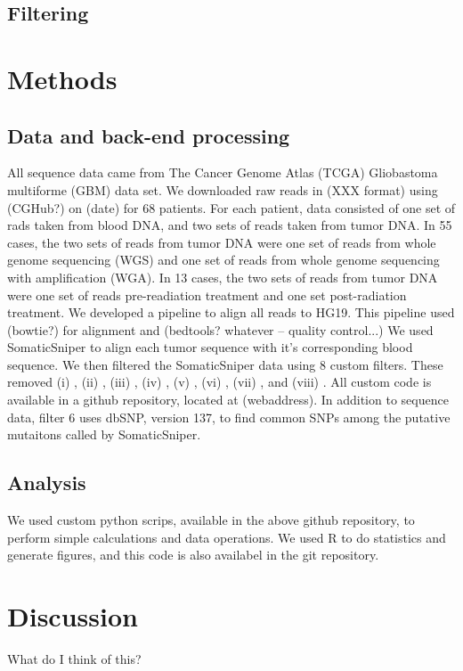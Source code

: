 \documentclass[11pt]{article} %
\begin{document}
\subsection{Filtering}

\section{Methods}

\subsection{Data and back-end processing}

All sequence data came from The Cancer Genome Atlas (TCGA) Gliobastoma multiforme (GBM) data set. We downloaded raw reads in (XXX format) using (CGHub?) on (date) for 68 patients. For each patient, data consisted of one set of rads taken from blood DNA, and two sets of reads taken from tumor DNA. In 55 cases, the two sets of reads from tumor DNA were one set of reads from whole genome sequencing (WGS) and one set of reads from whole genome sequencing with amplification (WGA). In 13 cases, the two sets of reads from tumor DNA were one set of reads pre-readiation treatment and one set post-radiation treatment. We developed a pipeline to align all reads to HG19. This pipeline used (bowtie?) for alignment and (bedtools? whatever -- quality control...) We used SomaticSniper to align each tumor sequence with it's corresponding blood sequence. We then filtered the SomaticSniper data using 8 custom filters. These removed (i) , (ii) , (iii) , (iv) , (v) , (vi) , (vii) , and (viii) . All custom code is available in a github repository, located at (webaddress). In addition to sequence data, filter 6 uses dbSNP, version 137, to find common SNPs among the putative mutaitons called by SomaticSniper.

\subsection{Analysis}

We used custom python scrips, available in the above github repository, to perform simple calculations and data operations. We used R to do statistics and generate figures, and this code is also availabel in the git repository.  

\section{Discussion}

What do I think of this?
\end{document}
